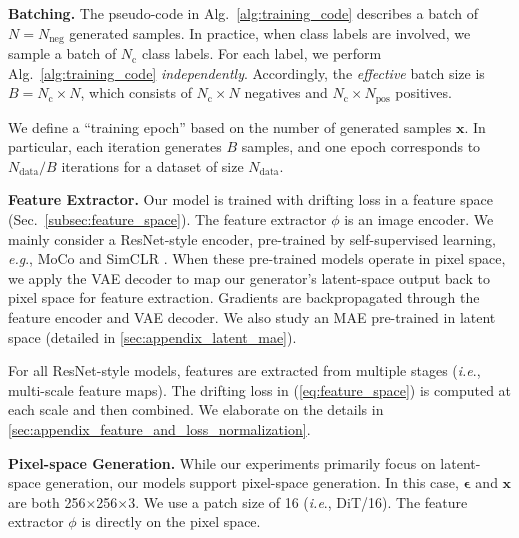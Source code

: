 \documentclass{article}
\newcommand{\vv}[1]{\mathbf{#1}}
\newcommand{\x}{\vv{x}}
\newcommand{\e}{{\boldsymbol{\epsilon}}}
\renewcommand{\paragraph}[1]{\vspace{.05em}\noindent\textbf{#1}}
\def\onedot{.}
\def\eg{\emph{e.g}\onedot} \def\Eg{\emph{E.g}\onedot}
\def\ie{\emph{i.e}\onedot} \def\Ie{\emph{I.e}\onedot}
\theoremstyle{plain}
\theoremstyle{definition}
\theoremstyle{remark}
\begin{document}
\paragraph{Batching.} The pseudo-code in Alg.~\ref{alg:training_code} describes a batch of $N=N_\text{neg}$ generated samples. In practice, when class labels are involved, we sample a batch of $N_\text{c}$ class labels. For each label, we perform Alg.~\ref{alg:training_code} \textit{independently}. Accordingly, the \textit{effective} batch size is $B=N_\text{c}{\times}N$, which consists of $N_\text{c}{\times}N$ negatives and $N_\text{c}{\times}N_\text{pos}$ positives.

We define a ``training epoch'' based on the number of generated samples $\x$.
In particular, each iteration generates $B$ samples, and one epoch corresponds to $N_\text{data}/B$ iterations for a dataset of size $N_\text{data}$.

\paragraph{Feature Extractor.} Our model is trained with drifting loss in a feature space (Sec.~\ref{subsec:feature_space}).
The feature extractor $\phi$ is an image encoder.
We mainly consider a ResNet-style \cite{he2016deep} encoder, pre-trained by self-supervised learning, \eg, MoCo \cite{he2020momentum} and SimCLR \cite{chen2020simple}.
When these pre-trained models operate in pixel space, we apply the VAE decoder to map our generator’s latent-space output back to pixel space for feature extraction. Gradients are backpropagated through the feature encoder and VAE decoder.
We also study an MAE \cite{he2022masked} pre-trained in latent space (detailed in \ref{sec:appendix_latent_mae}).

For all ResNet-style models, features are extracted from multiple stages (\ie, multi-scale feature maps). The drifting loss in (\ref{eq:feature_space}) is computed at each scale and then combined. We elaborate on the details in \ref{sec:appendix_feature_and_loss_normalization}.


\paragraph{Pixel-space Generation.}
While our experiments primarily focus on latent-space generation, our models support pixel-space generation. In this case, $\e$ and $\x$ are both 256$\times$256$\times$3. We use a patch size of 16 (\ie, DiT/16). The feature extractor $\phi$ is directly on the pixel space.
\end{document}
